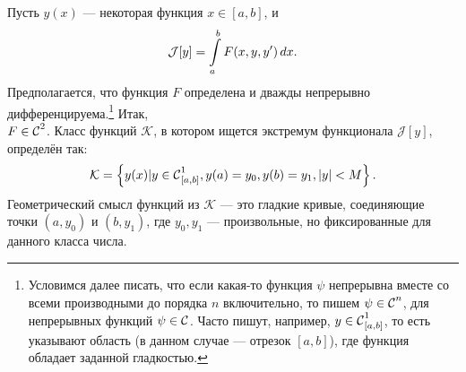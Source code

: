 \documentclass[12pt,a4paper,openany,fleqn]{book}
\newcommand{\Cf}{\ensuremath{\mathcal{C}}}
\newcommand{\J}{\ensuremath{\mathcal{J}}}
\newcommand{\mc}[1]{\ensuremath{\mathcal{#1}}}
\newcommand{\Cfn}[2][]{\ensuremath{\Cf{\mathstrut}^{#2}_{#1}}}
\theoremstyle{definition}
\begin{document}
	Пусть $y(x)$ --- некоторая функция $x\in{[a,b]}$, и
	\begin{equation*}
		\hfill\J[y]=\int\limits_a^b F(x,y,y')\,dx.\hfill
	\end{equation*}
	Предполагается, что функция $F$ определена и дважды непрерывно дифференцируема.\footnote{Условимся далее писать, что если какая-то функция $\psi$ непрерывна вместе со всеми производными до порядка $n$ включительно, то пишем $\psi\in\Cfn[]{n}$, для непрерывных функций $\psi\in\Cfn[]{}$. Часто пишут, например, $y\in\Cfn[{[a,b]}]{1}$, то есть указывают область (в данном случае --- отрезок ${[a,b]}$), где функция обладает заданной гладкостью.} Итак,\\ $F\in\Cfn[]{2}$. Класс функций $\mc{K}$, в котором ищется экстремум функционала $\J[y]$, определён так:
	\begin{equation*}
		\hfill\mc{K}=\left\{y(x)|y\in\Cfn[{[a,b]}]{1}, y(a)=y_0, y(b)=y_1, |y|<M\right\}.\hfill
	\end{equation*} 
	Геометрический смысл функций из $\mc{K}$ --- это гладкие кривые, соединяющие точки $(a,y_0)$ и $(b, y_1)$, где $y_0, y_1$ --- произвольные, но фиксированные для данного класса числа.
	
	
\end{document}

